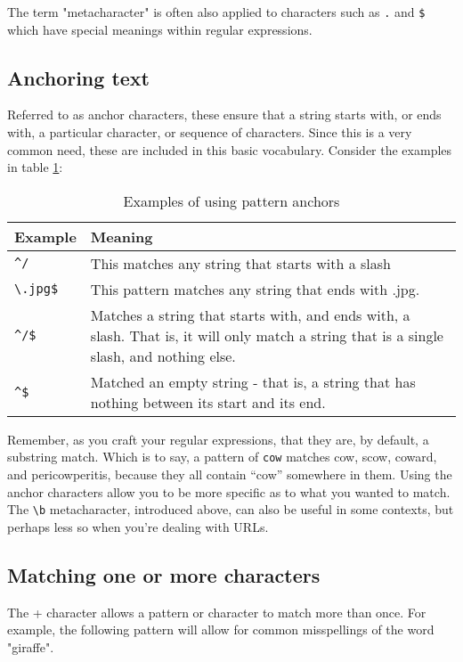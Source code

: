 The term "metacharacter" is often also applied to characters such as \verb=.= and \verb=$= which have special 
meanings within regular expressions.

\subsection{Anchoring text}
\index{\verb=^=}
\index{\verb=$=}

Referred to as anchor characters, these ensure that a string starts with, or ends with, a 
particular character, or sequence of characters. Since this is a very common need, these are 
included in this basic vocabulary. Consider the examples in table \ref{anchorexamples}:

\begin{table}[ht]
\caption{Examples of using pattern anchors}
\label{anchorexamples}
\begin{tabular}{l | p{12cm}}
Example & Meaning\\ \hline \hline
\verb=^/= & This matches any string that starts with a slash \\ \hline
\verb=\.jpg$= & This pattern matches any string that ends with .jpg. \\ \hline
\verb=^/$= & Matches a string that starts with, and ends with, a slash. That is, it will only 
match a string that is a single slash, and nothing else. \\ \hline
\verb=^$= & Matched an empty string - that
is, a string that has nothing between its start and its end. \\ \hline
\end{tabular}
\end{table}

Remember, as you craft your regular expressions, that they are, by
default, a substring match. Which is to say, a pattern of \verb=cow=
matches cow, scow, coward, and pericowperitis, because they all
contain ``cow'' somewhere in them. Using the anchor characters allow you
to be more specific as to what you wanted to match. The \verb=\b=
metacharacter, introduced above, can also be useful in some contexts,
but perhaps less so when you're dealing with URLs.

\subsection{Matching one or more characters}
\index{+}

The + character allows a pattern or character to match more than once. For example, the 
following pattern will allow for common misspellings of the word "giraffe".

